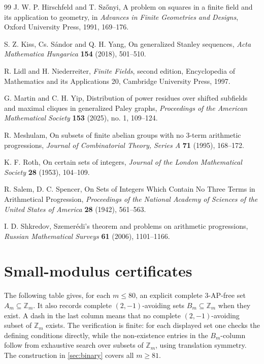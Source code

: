 \documentclass[11pt]{article}
\newcommand{\Z}{\mathbb Z}
\begin{document}
\begin{thebibliography}{99}
		J. W. P. Hirschfeld and T. Sz\H{o}nyi,
		A problem on squares in a finite field and its application to geometry,
		in \emph{Advances in Finite Geometries and Designs}, Oxford University Press, 1991, 169--176.
		
		S. Z. Kiss, Cs. S\'andor and Q. H. Yang,
		On generalized Stanley sequences,
		\emph{Acta Mathematica Hungarica} \textbf{154} (2018), 501--510.
		
		
		
		
		R. Lidl and H. Niederreiter,
		\emph{Finite Fields}, second edition,
		Encyclopedia of Mathematics and its Applications 20,
		Cambridge University Press, 1997.
		
		G. Martin and C. H. Yip,
		Distribution of power residues over shifted subfields and maximal cliques in generalized Paley graphs,
		\emph{Proceedings of the American Mathematical Society} \textbf{153} (2025), no. 1, 109--124.
		
		R. Meshulam,
		On subsets of finite abelian groups with no 3-term arithmetic progressions,
		\emph{Journal of Combinatorial Theory, Series A} \textbf{71} (1995), 168--172.
		
		K. F. Roth,
		On certain sets of integers,
		\emph{Journal of the London Mathematical Society} \textbf{28} (1953), 104--109.
		
		R. Salem,  D. C. Spencer,
		On Sets of Integers Which Contain No Three Terms in Arithmetical Progression,
		\emph{Proceedings of the National Academy of Sciences of the United States of America}
		\textbf{28} (1942), 561–563. 
		
		I. D. Shkredov,
		Szemer\'edi's theorem and problems on arithmetic progressions,
		\emph{Russian Mathematical Surveys} \textbf{61} (2006), 1101--1166.
		
	\end{thebibliography}
	\newpage 
	
	
	\appendix
	
	\section{Small-modulus certificates}\label{app:small-table}
	
	The following table gives, for each $m\le80$, an explicit complete $3$-AP-free set $A_m\subseteq\Z_m$.  It also records complete $(2,-1)$-avoiding sets $B_m\subseteq\Z_m$ when they exist.  A dash in the last column means that no complete $(2,-1)$-avoiding subset of $\Z_m$ exists.  The verification is finite: for each displayed set one checks the defining conditions directly, while the non-existence entries in the $B_m$-column follow from exhaustive search over subsets of $\Z_m$, using translation symmetry.  The construction in \cref{sec:binary} covers all $m\ge81$.
	
\end{document}
